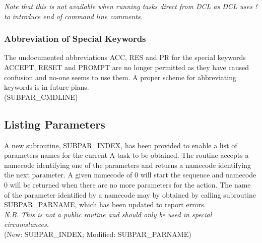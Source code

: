 {\em Note that this is not available when running tasks direct from DCL as DCL
uses ! to introduce end of command line comments.}

\subsubsection{Abbreviation of Special Keywords}
The undocumented abbreviations ACC, RES and PR for the special keywords 
ACCEPT, RESET and PROMPT are no longer permitted as they have caused
confusion and no-one seems to use them. A proper scheme for abbreviating 
keywords is in future plans.\\
(SUBPAR\_CMDLINE)
\subsection{Listing Parameters}
A new subroutine, SUBPAR\_INDEX, has been provided to enable a list of 
parameters names for the current A-task to be obtained. 
The routine accepts a namecode identifying one of the parameters and returns 
a namecode identifying the next parameter. A given namecode of 0 will start 
the sequence and namecode 0 will be returned when there are no more 
parameters for the action.
The name of the parameter identified by a namecode may by obtained by calling
subroutine SUBPAR\_PARNAME, which has been updated to report errors.\\
{\em N.B. This is not a public routine and should only be used in special
circumstances.}\\
(New: SUBPAR\_INDEX; Modified: SUBPAR\_PARNAME)

